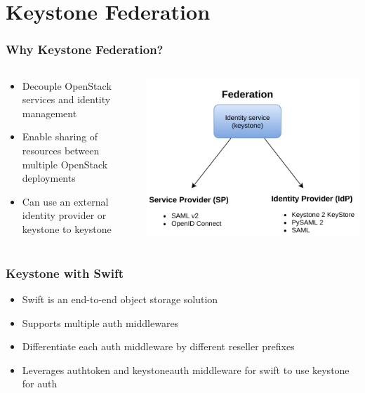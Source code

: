 \documentclass[aspectratio=169,11pt,hyperref={colorlinks=true}]{beamer}
\begin{document}
\section{Keystone Federation}
\begin{frame}
    \frametitle{Why Keystone Federation?}
    \begin{columns}
    \begin{column}{.48\textwidth}
    \begin{itemize}
        \item Decouple OpenStack services and identity management
        \item Enable sharing of resources between multiple OpenStack deployments
        \item Can use an external identity provider or keystone to keystone
    \end{itemize}
    \end{column}
    \begin{column}{.48\textwidth}
        \includegraphics[width=.85\textwidth]{keystone-federation.png}
    \end{column}
    \end{columns}
\end{frame}

\begin{frame}
    \frametitle{Keystone with Swift}
    \begin{itemize}
        \item Swift is an end-to-end object storage solution
        \item Supports multiple auth middlewares
        \item Differentiate each auth middleware by different reseller prefixes
        \item Leverages authtoken and keystoneauth middleware for swift to use keystone for auth
    \end{itemize}
\end{frame}
\end{document}
